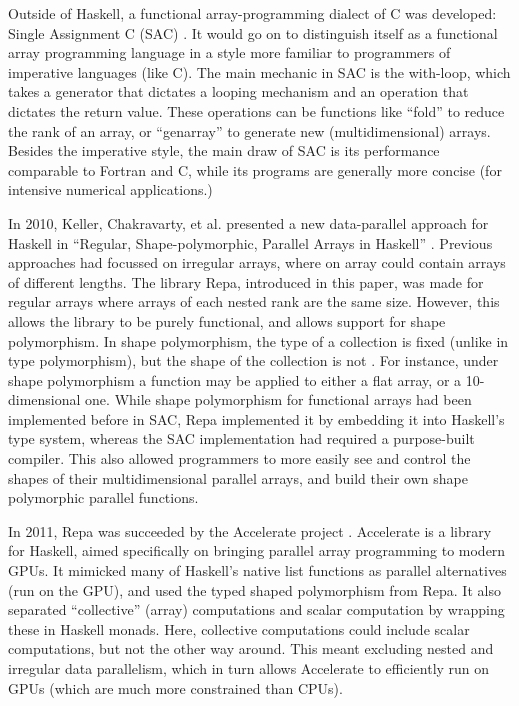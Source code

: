         Outside of Haskell, a functional array-programming dialect of C was developed: Single Assignment C (SAC) \cite{scholz1994single, scholz2003single, grelck2005generic}.
        It would go on to distinguish itself as a functional array programming language in a style more familiar to programmers of imperative languages (like C).
        The main mechanic in SAC is the with-loop, which takes a generator that dictates a looping mechanism and an operation that dictates the return value.
        These operations can be functions like ``fold'' to reduce the rank of an array, or ``genarray'' to generate new (multidimensional) arrays.
        Besides the imperative style, the main draw of SAC is its performance comparable to Fortran and C, while its programs are generally more concise (for intensive numerical applications.)

        In 2010, Keller, Chakravarty, et al. presented a new data-parallel approach for Haskell in ``Regular, Shape-polymorphic, Parallel Arrays in Haskell'' \cite{keller2010regular}.
        Previous approaches had focussed on irregular arrays, where on array could contain arrays of different lengths.
        The library Repa, introduced in this paper, was made for regular arrays where arrays of each nested rank are the same size.
        However, this allows the library to be purely functional, and allows support for shape polymorphism.
        In shape polymorphism, the type of a collection is fixed (unlike in type polymorphism), but the shape of the collection is not \cite{jay1994shapely}.
        For instance, under shape polymorphism a function may be applied to either a flat array, or a 10-dimensional one.
        While shape polymorphism for functional arrays had been implemented before in SAC, Repa implemented it by embedding it into Haskell's type system, whereas the SAC implementation had required a purpose-built compiler.
        This also allowed programmers to more easily see and control the shapes of their multidimensional parallel arrays, and build their own shape polymorphic parallel functions.

        In 2011, Repa was succeeded by the Accelerate project \cite{chakravarty2011accelerating}.
        Accelerate is a library for Haskell, aimed specifically on bringing parallel array programming to modern GPUs.
        It mimicked many of Haskell's native list functions as parallel alternatives (run on the GPU), and used the typed shaped polymorphism from Repa.
        It also separated ``collective'' (array) computations and scalar computation by wrapping these in Haskell monads.
        Here, collective computations could include scalar computations, but not the other way around.
        This meant excluding nested and irregular data parallelism, which in turn allows Accelerate to efficiently run on GPUs (which are much more constrained than CPUs).
        
